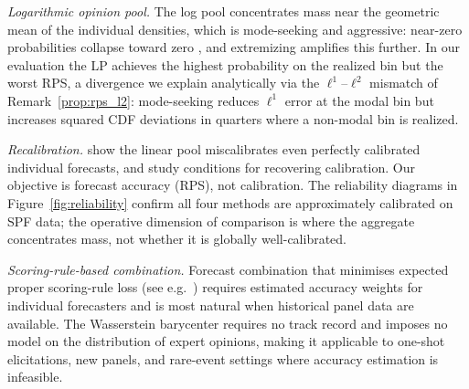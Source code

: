 \textit{Logarithmic opinion pool.}  The log pool concentrates mass near the geometric mean of the individual densities, which is mode-seeking and aggressive: near-zero probabilities collapse toward zero \cite{genest86}, and extremizing \cite{satopaa14} amplifies this further.  In our evaluation the LP achieves the highest probability on the realized bin but the worst RPS, a divergence we explain analytically via the $\ell^1$--$\ell^2$ mismatch of Remark~\ref{prop:rps_l2}: mode-seeking reduces $\ell^1$ error at the modal bin but increases squared CDF deviations in quarters where a non-modal bin is realized.

\textit{Recalibration.}  \cite{ranjan10} show the linear pool miscalibrates even perfectly calibrated individual forecasts, and \cite{gneiting13} study conditions for recovering calibration.  Our objective is forecast accuracy (RPS), not calibration.  The reliability diagrams in Figure~\ref{fig:reliability} confirm all four methods are approximately calibrated on SPF data; the operative dimension of comparison is where the aggregate concentrates mass, not whether it is globally well-calibrated.

\textit{Scoring-rule-based combination.}  Forecast combination that minimises expected proper scoring-rule loss (see e.g.\ \cite{gneiting07}) requires estimated accuracy weights for individual forecasters and is most natural when historical panel data are available.  The Wasserstein barycenter requires no track record and imposes no model on the distribution of expert opinions, making it applicable to one-shot elicitations, new panels, and rare-event settings where accuracy estimation is infeasible.

